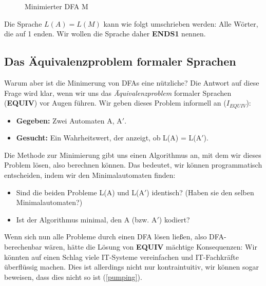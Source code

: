\begin{figure}[ht] %
\centering %
\caption{Minimierter DFA M}
\label{fig:mindfa}
\end{figure}

Die Sprache $L(A) = L(M)$ kann wie folgt umschrieben werden:
Alle Wörter, die auf 1 enden.
Wir wollen die Sprache daher \textbf{ENDS1} nennen.

\subsection{Das Äquivalenzproblem formaler Sprachen}

Warum aber ist die Minimerung von DFAs eine nützliche? 
Die Antwort auf diese Frage wird klar,
wenn wir uns das \emph{Äquivalenzproblem} formaler Sprachen (\textbf{EQUIV})
vor Augen führen.
Wir geben dieses Problem informell an ($I_{EQUIV}$):
\begin{itemize}
    \item \textbf{Gegeben:} Zwei Automaten A, A$'$.
    \item \textbf{Gesucht:} Ein Wahrheitswert, der anzeigt, ob L(A) = L(A$'$).
\end{itemize}
Die Methode zur Minimierung gibt uns einen Algorithmus an,
mit dem wir dieses Problem lösen, also berechnen können.
Das bedeutet, wir können programmatisch entscheiden,
indem wir den Minimalautomaten finden:
\begin{itemize}
    \item Sind die beiden Probleme L(A) und L(A$'$) identisch?
        (Haben sie den selben Minimalautomaten?)
    \item Ist der Algorithmus minimal, den A (bzw. A$'$) kodiert?
\end{itemize}

Wenn sich nun alle Probleme durch einen DFA lösen ließen,
also DFA-berechenbar wären,
hätte die Lösung von \textbf{EQUIV} mächtige Konsequenzen:
Wir könnten auf einen Schlag
viele IT-Systeme vereinfachen und IT-Fachkräfte überflüssig machen.
Dies ist allerdings nicht nur kontraintuitiv, 
wir können sogar beweisen, dass dies nicht so ist (\autoref{pumping}).

